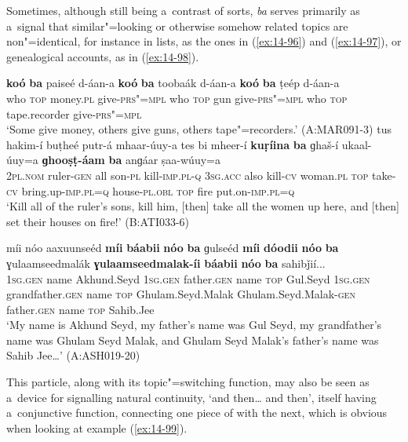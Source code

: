 Sometimes, although still being a~contrast of sorts, \textit{ba} serves primarily as a~signal that similar"=looking or otherwise somehow related topics are non"=identical, for instance in lists, as the ones in (\ref{ex:14-96}) and (\ref{ex:14-97}), or genealogical accounts, as in (\ref{ex:14-98}). 

\ea
\label{ex:14-96}
\gll \textbf{koó} \textbf{ba} paiseé d-áan-a \textbf{koó} \textbf{ba} toobaák d-áan-a \textbf{koó} \textbf{ba} ṭeép d-áan-a\\
who \textsc{top} money.\textsc{pl} give-\textsc{prs"=mpl} who \textsc{top} gun  give-\textsc{prs"=mpl} who \textsc{top} tape.recorder give-\textsc{prs"=mpl} \\
\glt `Some give money, others give guns, others tape"=recorders.' (A:MAR091-3) 
\ex
\label{ex:14-97}
\gll tus hakim-í buṭheé putr-á mhaar-úuy-a tes bi mheer-í \textbf{kuṛíina} \textbf{ba} ɡhaš-í ukaal-úuy=a \textbf{ɡhooṣṭ-áam} \textbf{ba} anɡáar ṣaa-wúuy=a\\
\textsc{2pl.nom} ruler-\textsc{gen} all son-\textsc{pl} kill-\textsc{imp.pl-q} \textsc{3sg.acc} also kill-\textsc{cv} woman.\textsc{pl} \textsc{top} take-\textsc{cv} bring.up-\textsc{imp.pl=q}  house-\textsc{pl.obl} \textsc{top} fire put.on-\textsc{imp.pl=q}\\
\glt `Kill all of the ruler's sons, kill him, [then] take all the women up here, and [then] set their houses on fire!' (B:ATI033-6)

\ex
\label{ex:14-98}
\gll míi nóo aaxuunseéd \textbf{míi} \textbf{báabii} \textbf{nóo} \textbf{ba}  ɡulseéd \textbf{míi} \textbf{dóodii} \textbf{nóo} \textbf{ba} ɣulaamseedmalák \textbf{ɣulaamseedmalak-íi} \textbf{báabii} \textbf{nóo} \textbf{ba} sahibǰií... \\
\textsc{1sg.gen} name Akhund.Seyd \textsc{1sg.gen} father.\textsc{gen} name \textsc{top} Gul.Seyd \textsc{1sg.gen} grandfather.\textsc{gen} name \textsc{top} Ghulam.Seyd.Malak Ghulam.Seyd.Malak-\textsc{gen} father.\textsc{gen} name \textsc{top} Sahib.Jee  \\
\glt `My name is Akhund Seyd, my father's name was Gul Seyd, my grandfather's name was Ghulam Seyd Malak, and Ghulam Seyd Malak's father's name was Sahib Jee{\ldots}' (A:ASH019-20)
\z

This particle, along with its topic"=switching function, may also be seen as a~device for signalling natural continuity, `and then{\ldots} and then', itself having a~conjunctive function, connecting one piece of  with the next, which is obvious when looking at example (\ref{ex:14-99}).

